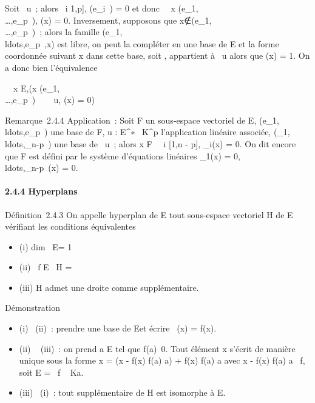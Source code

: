 \documentclass[]{article}
\begin{document}
Soit \phi \in\mathrmKer~u~; alors
\forall~i \in {[}1,p{]}, \phi(e\_i~) = 0 et donc
\forall~~x
\in\mathrmVect(e\_1,\\\ldots,e\_p~),
\phi(x) = 0. Inversement, supposons que
x∉\mathrmVect(e\_1,\\\ldots,e\_p~)~;
alors la famille
(e\_1,\\ldots,e\_p~,x)
est libre, on peut la compléter en une base de E et la forme coordonnée
suivant x dans cette base, soit \phi, appartient à
\mathrmKer~u alors que \phi(x)
= 1. On a donc bien l'équivalence

\forall~~x \in E,\quad (x
\in\mathrmVect(e\_1,\\\ldots,e\_p~)
\Leftrightarrow \forall~~\phi
\in\mathrmKer~u, \phi(x) = 0)

Remarque~2.4.4 Application~: Soit F un sous-espace vectoriel de E,
(e\_1,\\ldots,e\_p~)
une base de F, u : E^∗\rightarrow~ K^p l'application linéaire
associée,
(\phi\_1,\\ldots,\phi\_n-p~)
une base de \mathrmKer~u~;
alors x \in F \Leftrightarrow \forall~~i \in
{[}1,n - p{]}, \phi\_i(x) = 0. On dit encore que F est défini par
le système d'équations linéaires \phi\_1(x) =
0,\\ldots,\phi\_n-p~(x)
= 0.

\paragraph{2.4.4 Hyperplans}

Définition~2.4.3 On appelle hyperplan de E tout sous-espace vectoriel H
de E vérifiant les conditions équivalentes

\begin{itemize}
\itemsep1pt\parskip0pt
\item
  (i) dim~ E\diagupH = 1
\item
  (ii) \exists~f \in E
  \diagdown\0\, H =\
  \mathrmKerf
\item
  (iii) H admet une droite comme supplémentaire.
\end{itemize}

Démonstration

\begin{itemize}
\itemsep1pt\parskip0pt
\item
  (i) \rigtharrow~(ii)~: prendre \overlinee une base de E\diagupH et
  écrire \pi~(x) = f(x)\overlinee.
\item
  (ii) \rigtharrow~ (iii)~: on prend a \in E tel que
  f(a)\neq~0. Tout élément x s'écrit de manière
  unique sous la forme x = (x - f(x) \over f(a) a)
  + f(x) \over f(a) a avec x - f(x)
  \over f(a) a
  \in\mathrmKer~f, soit E
  = \mathrmKer~f \oplus~ Ka.
\item
  (iii) \rigtharrow~(i)~: tout supplémentaire de H est isomorphe à E\diagupH.
\end{itemize}
\end{document}
